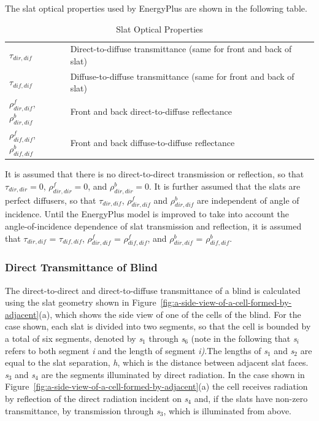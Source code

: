 The slat optical properties used by EnergyPlus are shown in the following table.

\begin{longtable}[c]{p{1.5in}p{2.5in}}
\caption{Slat Optical Properties \label{table:slat-optical-properties}} \tabularnewline
\toprule
\({\tau_{dir,dif}}\) & Direct-to-diffuse transmittance (same for front and back of slat) \tabularnewline
\({\tau_{dif,dif}}\) & Diffuse-to-diffuse transmittance (same for front and back of slat) \tabularnewline
\(\rho_{dir,dif}^f\), \(\rho_{dir,dif}^b\) & Front and back direct-to-diffuse reflectance \tabularnewline
\(\rho_{dif,dif}^f\), \(\rho_{dif,dif}^b\) & Front and back diffuse-to-diffuse reflectance \tabularnewline
\bottomrule
\end{longtable}

It is assumed that there is no direct-to-direct transmission or reflection, so that \({\tau_{dir,dir}} = 0\), \(\rho_{dir,dir}^f = 0\), and \(\rho_{dir,dir}^b = 0\). It is further assumed that the slats are perfect diffusers, so that \({\tau_{dir,dif}}\), \(\rho_{dir,dif}^f\) and \(\rho_{dir,dif}^b\) are independent of angle of incidence. Until the EnergyPlus model is improved to take into account the angle-of-incidence dependence of slat transmission and reflection, it is assumed that \({\tau_{dir,dif}}\) = \({\tau_{dif,dif}}\), \(\rho_{dir,dif}^f\) = \(\rho_{dif,dif}^f\), and \(\rho_{dir,dif}^b\) = \(\rho_{dif,dif}^b\).

\subsubsection{Direct Transmittance of Blind}\label{direct-transmittance-of-blind}

The direct-to-direct and direct-to-diffuse transmittance of a blind is calculated using the slat geometry shown in Figure~\ref{fig:a-side-view-of-a-cell-formed-by-adjacent}(a), which shows the side view of one of the cells of the blind. For the case shown, each slat is divided into two segments, so that the cell is bounded by a total of six segments, denoted by \emph{s\(_{1}\)} through \emph{s\(_{6}\)} (note in the following that \emph{s\(_{i}\)} refers to both segment \emph{i} and the length of segment \emph{i)}.The lengths of \emph{s\(_{1}\)} and \emph{s\(_{2}\)} are equal to the slat separation, \emph{h}, which is the distance between adjacent slat faces. \emph{s\(_{3}\)} and \emph{s\(_{4}\)} are the segments illuminated by direct radiation. In the case shown in Figure~\ref{fig:a-side-view-of-a-cell-formed-by-adjacent}(a) the cell receives radiation by reflection of the direct radiation incident on \emph{s\(_{4}\)} and, if the slats have non-zero transmittance, by transmission through \emph{s\(_{3}\)}, which is illuminated from above.

